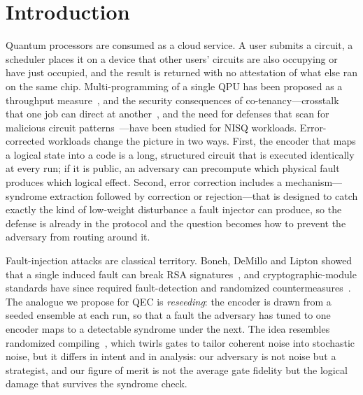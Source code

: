 \section{Introduction}\label{sec:qec:intro}

Quantum processors are consumed as a cloud service. A user submits a circuit, a scheduler places it on a device that other users' circuits are also occupying or have just occupied, and the result is returned with no attestation of what else ran on the same chip. Multi-programming of a single QPU has been proposed as a throughput measure~\cite{das2019multiprogramming}, and the security consequences of co-tenancy---crosstalk that one job can direct at another~\cite{ashsaki2020crosstalk}, and the need for defenses that scan for malicious circuit patterns~\cite{deshpande2022antivirus}---have been studied for NISQ workloads. Error-corrected workloads change the picture in two ways. First, the encoder that maps a logical state into a code is a long, structured circuit that is executed identically at every run; if it is public, an adversary can precompute which physical fault produces which logical effect. Second, error correction includes a mechanism---syndrome extraction followed by correction or rejection---that is designed to catch exactly the kind of low-weight disturbance a fault injector can produce, so the defense is already in the protocol and the question becomes how to prevent the adversary from routing around it.

Fault-injection attacks are classical territory. Boneh, DeMillo and Lipton showed that a single induced fault can break RSA signatures~\cite{boneh1997faults}, and cryptographic-module standards have since required fault-detection and randomized countermeasures~\cite{nist2019fips1403}. The analogue we propose for QEC is \emph{reseeding}: the encoder is drawn from a seeded ensemble at each run, so that a fault the adversary has tuned to one encoder maps to a detectable syndrome under the next. The idea resembles randomized compiling~\cite{wallman2016randomizedcompiling}, which twirls gates to tailor coherent noise into stochastic noise, but it differs in intent and in analysis: our adversary is not noise but a strategist, and our figure of merit is not the average gate fidelity but the logical damage that survives the syndrome check.

